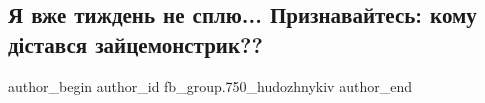  
 
 
 
 

\subsection{Я вже тиждень не сплю... Признавайтесь: кому дістався зайцемонстрик??}
\label{sec:19_03_2018.fb.fb_group.750_hudozhnykiv.1.ja_vzhe_tyzhden_ne_splju}

\ifcmt
 author_begin
   author_id fb_group.750_hudozhnykiv
 author_end
\fi
